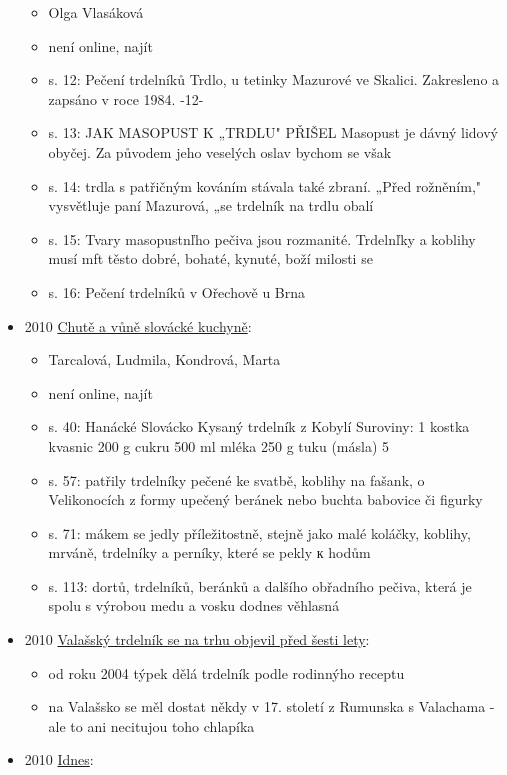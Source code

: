 \begin{itemize}
  \begin{itemize}
  \tightlist
  \item
    Olga Vlasáková
  \item
    není online, najít
  \item
    s. 12: Pečení trdelníků Trdlo, u tetinky Mazurové ve Skalici.
    Zakresleno a zapsáno v roce 1984. -12-
  \item
    s. 13: JAK MASOPUST K „TRDLU" PŘIŠEL Masopust je dávný lidový
    obyčej. Za původem jeho veselých oslav bychom se však
  \item
    s. 14: trdla s patřičným kováním stávala také zbraní. „Před
    rožněním," vysvětluje paní Mazurová, „se trdelník na trdlu obalí
  \item
    s. 15: Tvary masopustnľho pečiva jsou rozmanité. Trdelnľky a koblihy
    musí mft těsto dobré, bohaté, kynuté, boží milosti se
  \item
    s. 16: Pečení trdelníků v Ořechově u Brna
  \end{itemize}
\item
  2010
  \href{https://ceskadigitalniknihovna.cz/uuid/uuid:1b8fd480-8ee4-11ea-ae16-005056827e52}{Chutě
  a vůně slovácké kuchyně}:

  \begin{itemize}
  \tightlist
  \item
    Tarcalová, Ludmila, Kondrová, Marta
  \item
    není online, najít
  \item
    s. 40: Hanácké Slovácko Kysaný trdelník z Kobylí Suroviny: 1 kostka
    kvasnic 200 g cukru 500 ml mléka 250 g tuku (másla) 5
  \item
    s. 57: patřily trdelníky pečené ke svatbě, koblihy na fašank, o
    Velikonocích z formy upečený beránek nebo buchta babovice či figurky
  \item
    s. 71: mákem se jedly příležitostně, stejně jako malé koláčky,
    koblihy, mrváně, trdelníky a perníky, které se pekly к hodům
  \item
    s. 113: dortů, trdelníků, beránků a dalšího obřadního pečiva, která
    je spolu s výrobou medu a vosku dodnes věhlasná
  \end{itemize}
\item
  2010
  \href{https://zlinsky.denik.cz/podnikani/valassky-trdelnik-se-na-trhu-objevil-pred-8a2d.html}{Valašský
  trdelník se na trhu objevil před šesti lety}:

  \begin{itemize}
  \tightlist
  \item
    od roku 2004 týpek dělá trdelník podle rodinnýho receptu
  \item
    na Valašsko se měl dostat někdy v 17. století z Rumunska s Valachama
    - ale to ani necitujou toho chlapíka
  \end{itemize}
\item
  2010
  \href{https://www.idnes.cz/ekonomika/domaci/trdelnik-hrstka-testa-ktera-dobre-vydelava.A101230_125615_ekonomika_spi}{Idnes}:


\end{itemize}
